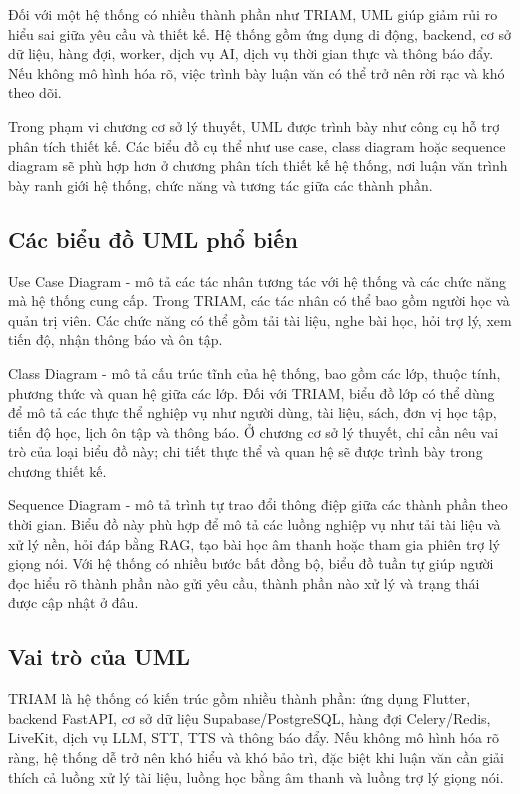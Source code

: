 \documentclass[12pt,a4paper]{report}
\begin{document}
Đối với một hệ thống có nhiều thành phần như TRIAM, UML giúp giảm rủi ro hiểu sai giữa yêu cầu và thiết kế. Hệ thống gồm ứng dụng di động, backend, cơ sở dữ liệu, hàng đợi, worker, dịch vụ AI, dịch vụ thời gian thực và thông báo đẩy. Nếu không mô hình hóa rõ, việc trình bày luận văn có thể trở nên rời rạc và khó theo dõi.

Trong phạm vi chương cơ sở lý thuyết, UML được trình bày như công cụ hỗ trợ phân tích thiết kế. Các biểu đồ cụ thể như use case, class diagram hoặc sequence diagram sẽ phù hợp hơn ở chương phân tích thiết kế hệ thống, nơi luận văn trình bày ranh giới hệ thống, chức năng và tương tác giữa các thành phần.

\subsection{Các biểu đồ UML phổ biến}

Use Case Diagram - mô tả các tác nhân tương tác với hệ thống và các chức năng mà hệ thống cung cấp. Trong TRIAM, các tác nhân có thể bao gồm người học và quản trị viên. Các chức năng có thể gồm tải tài liệu, nghe bài học, hỏi trợ lý, xem tiến độ, nhận thông báo và ôn tập.

Class Diagram - mô tả cấu trúc tĩnh của hệ thống, bao gồm các lớp, thuộc tính, phương thức và quan hệ giữa các lớp. Đối với TRIAM, biểu đồ lớp có thể dùng để mô tả các thực thể nghiệp vụ như người dùng, tài liệu, sách, đơn vị học tập, tiến độ học, lịch ôn tập và thông báo. Ở chương cơ sở lý thuyết, chỉ cần nêu vai trò của loại biểu đồ này; chi tiết thực thể và quan hệ sẽ được trình bày trong chương thiết kế.

Sequence Diagram - mô tả trình tự trao đổi thông điệp giữa các thành phần theo thời gian. Biểu đồ này phù hợp để mô tả các luồng nghiệp vụ như tải tài liệu và xử lý nền, hỏi đáp bằng RAG, tạo bài học âm thanh hoặc tham gia phiên trợ lý giọng nói. Với hệ thống có nhiều bước bất đồng bộ, biểu đồ tuần tự giúp người đọc hiểu rõ thành phần nào gửi yêu cầu, thành phần nào xử lý và trạng thái được cập nhật ở đâu.

\subsection{Vai trò của UML}

TRIAM là hệ thống có kiến trúc gồm nhiều thành phần: ứng dụng Flutter, backend FastAPI, cơ sở dữ liệu Supabase/PostgreSQL, hàng đợi Celery/Redis, LiveKit, dịch vụ LLM, STT, TTS và thông báo đẩy. Nếu không mô hình hóa rõ ràng, hệ thống dễ trở nên khó hiểu và khó bảo trì, đặc biệt khi luận văn cần giải thích cả luồng xử lý tài liệu, luồng học bằng âm thanh và luồng trợ lý giọng nói.
\end{document}
